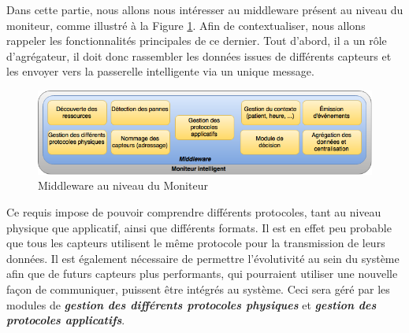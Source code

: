 Dans cette partie, nous allons nous intéresser au middleware présent au niveau du moniteur, comme illustré à la Figure \ref{4}. Afin de contextualiser, nous allons rappeler les fonctionnalités principales de ce dernier. Tout d'abord, il a un rôle d'agrégateur\cite{li2015iot}, il doit donc rassembler les données issues de différents capteurs et les envoyer vers la passerelle intelligente via un unique message. 
\newline
\begin{figure}[h!]
	\hspace*{-3cm}
	\centering
	\includegraphics[width=1.5\textwidth]{Figure4.png}
	\caption{Middleware au niveau du Moniteur}
	\label{4}
\end{figure}

Ce requis impose de pouvoir comprendre différents protocoles, tant au niveau physique que applicatif, ainsi que différents formats. Il est en effet peu probable que tous les capteurs utilisent le même protocole pour la transmission de leurs données. Il est également nécessaire de permettre l'évolutivité au sein du système afin que de futurs capteurs plus performants, qui pourraient utiliser une nouvelle façon de communiquer, puissent être intégrés au système. Ceci sera géré par les modules de \textbf{\textit{gestion des différents protocoles physiques}} et \textbf{\textit{gestion des protocoles applicatifs}}.
\newline

